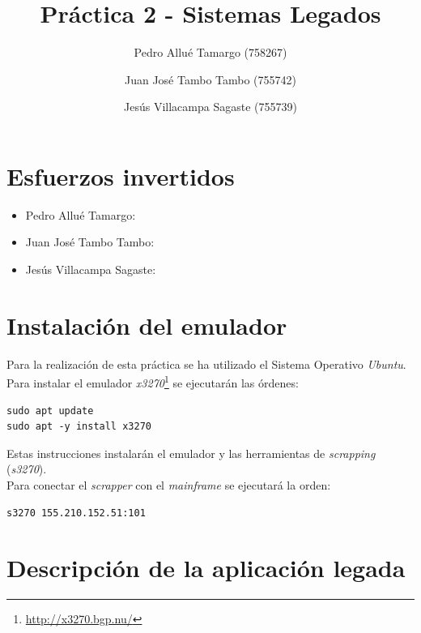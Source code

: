 \documentclass[10pt,a4paper]{article}
\begin{document}
\begin{titlepage}
\title{\textbf{{\Huge Práctica 2 - Sistemas Legados}}}
\author{
	Pedro Allué Tamargo (758267)
	\and
	Juan José Tambo Tambo (755742)
	\and
	Jesús Villacampa Sagaste (755739)
}
\clearpage\maketitle
\thispagestyle{empty}
\tableofcontents
\end{titlepage}

\section{Esfuerzos invertidos}

\begin{itemize}
\item Pedro Allué Tamargo:
\item Juan José Tambo Tambo:
\item Jesús Villacampa Sagaste:
\end{itemize}

\section{Instalación del emulador}

Para la realización de esta práctica se ha utilizado el Sistema Operativo \emph{Ubuntu}. Para instalar el emulador \emph{x3270}\footnote{\url{http://x3270.bgp.nu/}} se ejecutarán las órdenes:

\begin{lstlisting}
sudo apt update
sudo apt -y install x3270
\end{lstlisting}

Estas instrucciones instalarán el emulador y las herramientas de \emph{scrapping} (\emph{s3270}).\\

Para conectar el \emph{scrapper} con el \emph{mainframe} se ejecutará la orden:

\begin{lstlisting}
s3270 155.210.152.51:101
\end{lstlisting}


\section{Descripción de la aplicación legada}
\end{document}
